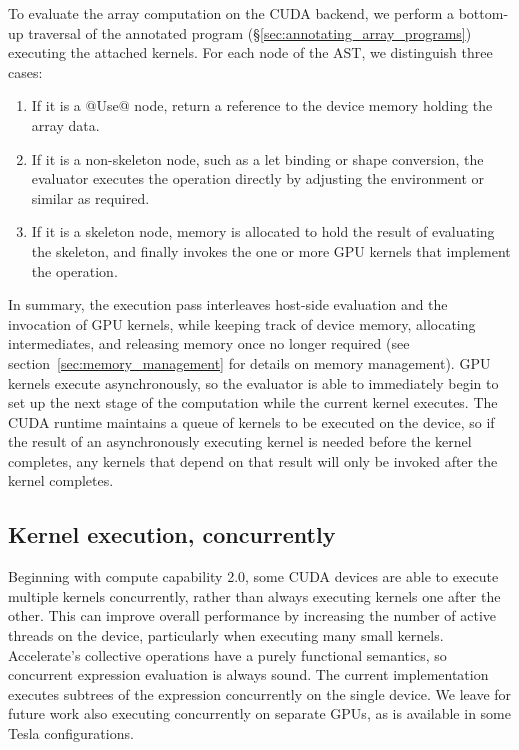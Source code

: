 To evaluate the array computation on the CUDA backend, we perform a bottom-up
traversal of the annotated program (\S\ref{sec:annotating_array_programs})
executing the attached kernels. For each node of the AST, we distinguish three
cases:
%
\begin{enumerate}
\item If it is a @Use@ node, return a reference to the device memory holding the
    array data.

\item If it is a non-skeleton node, such as a let binding or shape conversion,
    the evaluator executes the operation directly by adjusting the environment
    or similar as required.

\item If it is a skeleton node, memory is allocated to hold the result of
    evaluating the skeleton, and finally invokes the one or more GPU kernels
    that implement the operation.
\end{enumerate}
%
In summary, the execution pass interleaves host-side evaluation and the
invocation of GPU kernels, while keeping track of device memory, allocating
intermediates, and releasing memory once no longer required (see
section~\ref{sec:memory_management} for details on memory management). GPU
kernels execute asynchronously, so the evaluator is able to immediately begin to
set up the next stage of the computation while the current kernel executes. The
CUDA runtime maintains a queue of kernels to be executed on the device, so if
the result of an asynchronously executing kernel is needed before the kernel
completes, any kernels that depend on that result will only be invoked after the
kernel completes.

\subsection{Kernel execution, concurrently}

Beginning with compute capability 2.0, some CUDA devices are able to execute
multiple kernels concurrently, rather than always executing kernels one after
the other. This can improve overall performance by increasing the number of
active threads on the device, particularly when executing many small kernels.
Accelerate's collective operations have a purely functional semantics, so
concurrent expression evaluation is always sound. The current implementation
executes subtrees of the expression concurrently on the single device. We leave
for future work also executing concurrently on separate GPUs, as is available in
some Tesla configurations.

